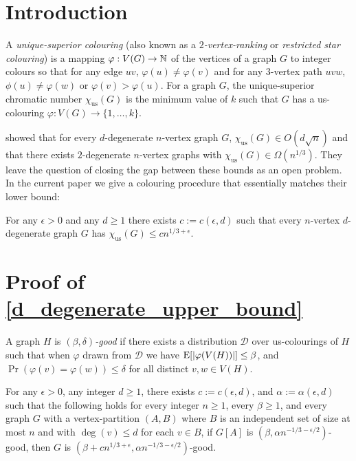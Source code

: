 \documentclass[kpfonts]{patmorin}
\newcommand{\defin}[1]{\emph{\color{brightmaroon}#1}}
\newcommand{\trn}{\chi_{\mathrm{us}}}
\begin{document}
\section{Introduction}

A \defin{unique-superior colouring} (also known as a \defin{$2$-vertex-ranking} or \defin{restricted star colouring}) is a mapping $\varphi:V(G)\to\mathbb{N}$ of the vertices of a graph $G$ to integer colours so that for any edge $uv$, $\varphi(u)\neq \varphi(v)$ and for any $3$-vertex path $uvw$, $\phi(u)\neq\varphi(w)$ or $\varphi(v)>\varphi(u)$.  For a graph $G$, the unique-superior chromatic number $\trn(G)$ is the minimum value of $k$ such that $G$ has a us-colouring $\varphi:V(G)\to\{1,\ldots,k\}$.

\citet{karpas.neiman.ea:on} showed that for every $d$-degenerate $n$-vertex graph $G$, $\trn(G)\in O(d\sqrt{n})$ and that there exists $2$-degenerate $n$-vertex graphs with $\trn(G)\in\Omega(n^{1/3})$.  They leave the question of closing the gap between these bounds as an open problem. In the current paper we give a colouring procedure that essentially matches their lower bound:

\begin{thm}\label{d_degenerate_upper_bound}
  For any $\epsilon >0$ and any $d\ge 1$ there exists $c:=c(\epsilon,d)$ such that every $n$-vertex $d$-degenerate graph $G$ has $\trn(G) \le c n^{1/3+\epsilon}$.
\end{thm}

\section{Proof of \cref{d_degenerate_upper_bound}}

A graph $H$ is \defin{$(\beta,\delta)$-good} if there exists a distribution $\mathcal{D}$ over us-colourings of $H$ such that when $\varphi$ drawn from $\mathcal{D}$ we have
$\mathrm{E}[|\varphi(V(H))|]\le \beta$, and $\Pr(\varphi(v)=\varphi(w))\le\delta$ for all distinct $v,w\in V(H)$.


\begin{lem}
  For any $\epsilon >0$, any integer $d\ge 1$, there exists $c:=c(\epsilon,d)$, and $\alpha:=\alpha(\epsilon,d)$ such that the following holds for every integer $n\ge 1$, every $\beta \ge 1$, and every graph $G$ with a vertex-partition $(A,B)$ where $B$ is an independent set of size at most $n$ and with $\deg(v)\le d$ for each $v\in B$,  if $G[A]$ is $(\beta,\alpha n^{-1/3-\epsilon/2})$-good, then  $G$ is $(\beta+cn^{1/3+\epsilon},\alpha n^{-1/3-\epsilon/2})$-good.
\end{lem}
\end{document}
